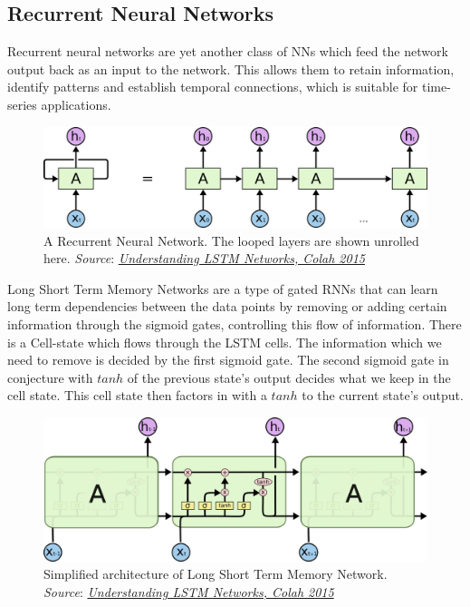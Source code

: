 \subsection{Recurrent Neural Networks}
Recurrent neural networks are yet another class of NNs which feed the network output back as an input to the network. This allows them to retain information, identify patterns and establish temporal connections, which is suitable for time-series applications.
\begin{figure}[h]
    \centering
    \includegraphics[scale=0.3]{Images/RNNs_1.png}
    \caption{A Recurrent Neural Network. The looped layers are shown unrolled here. \emph{Source}: \href{https://colah.github.io/posts/2015-08-Understanding-LSTMs/}{\textit{Understanding LSTM Networks, Colah 2015}}}
    \label{fig:RNN}
\end{figure}
Long Short Term Memory Networks are a type of gated RNNs that can learn long term dependencies between the data points by removing or adding certain information through the sigmoid gates, controlling this flow of information. There is a Cell-state which flows through the LSTM cells. The information which we need to remove is decided by the first sigmoid gate. The second sigmoid gate in conjecture with $tanh$ of the previous state's output decides what we keep in the cell state. This cell state then factors in with a $tanh$ to the current state's output.
\begin{figure}[h]
    \centering
    \includegraphics[scale=0.35]{Images/LSTM.png}
    \caption{Simplified architecture of Long Short Term Memory Network. \emph{Source}: \href{https://colah.github.io/posts/2015-08-Understanding-LSTMs/}{\textit{Understanding LSTM Networks, Colah 2015}}}
    \label{fig:LSTM}
\end{figure}
